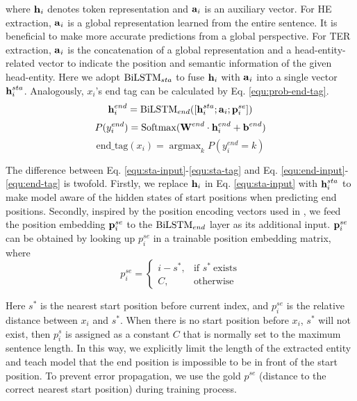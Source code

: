 \documentclass{ecai}
\begin{document}
\noindent where $\boldsymbol{\rm{h}}_i$ denotes token representation and $\boldsymbol{\rm{a}}_i$ is an auxiliary vector. 
For HE extraction, $\boldsymbol{\rm{a}}_i$ is a global representation learned from the entire sentence. 
It is beneficial to make more accurate predictions from a global perspective. 
For TER extraction, $\boldsymbol{\rm{a}}_i$ is the concatenation of a global representation and a head-entity-related vector to indicate the position and semantic information of the given head-entity.  
Here we adopt ${\rm{BiLSTM}}_{sta}$ to fuse $\boldsymbol{\rm{h}}_i$ with $\boldsymbol{\rm{a}}_i$ into a single vector $\boldsymbol{\rm{h}}^{sta}_i$. 
Analogously, $x_i$'s end tag can be calculated by Eq. \ref{equ:prob-end-tag}.
\begin{equation}
\label{equ:end-input}
   \boldsymbol{\rm{h}}^{end}_i = {\rm{BiLSTM}}_{end}([\boldsymbol{\rm{h}}^{sta}_i;\boldsymbol{\rm{a}}_i;\boldsymbol{\rm{p}}_i^{se}])
\end{equation}
\begin{equation}
\label{equ:prob-end-tag}
P(y^{end}_i) = {\rm{Softmax}}(\boldsymbol{\rm{W}}^{end}\cdot \boldsymbol{\rm{h}}^{end}_i + \boldsymbol{\rm{b}}^{end})
\end{equation}
\begin{equation}
\label{equ:end-tag}
\text{end\_tag}(x_i)=\mathop{\arg\max}_{k} P(y^{end}_i=k)
\end{equation}

The difference between Eq. \ref{equ:sta-input}-\ref{equ:sta-tag} and Eq. \ref{equ:end-input}-\ref{equ:end-tag} is twofold. 
Firstly, we replace  $\boldsymbol{\rm{h}}_i$ in Eq. \ref{equ:sta-input} with  $\boldsymbol{\rm{h}}^{sta}_i$ to make model aware of the hidden states of start positions when predicting end positions. 
Secondly, inspired by the position encoding vectors used in \cite{zeng2014relation}, we feed the position embedding $\boldsymbol{\rm{p}}_i^{se}$ to the ${\rm{BiLSTM}}_{end}$ layer as its additional input. 
$\boldsymbol{\rm{p}}_i^{se}$ can be obtained by looking up $p^{se}_i$ in a trainable position embedding matrix, where 
\begin{equation}
\label{equ:pe-hbm}
p^{se}_i =
\begin{cases}
i-s^{*}, & \mbox{if } s^* \ \mbox{exists}\\
C, & \mbox{otherwise}
\end{cases} 
\end{equation}

Here $s^{*}$ is the nearest start position before current index, and $p^{se}_i$ is the relative distance between $x_i$ and $s^{*}$. 
When there is no start position before $x_i$, $s^{*}$ will not exist, then $p^{s}_i$ is assigned as a constant $C$ that is normally set to the maximum sentence length. 
In this way, we explicitly limit the length of the extracted entity and teach model that the end position is impossible to be in front of the start position. 
To prevent error propagation, we use the gold $p^{se}$ (distance to the correct nearest start position) during training process.
\end{document}
